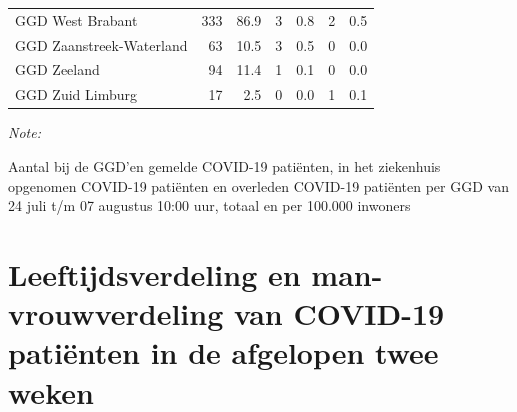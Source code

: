 \documentclass[
  english,
  man,floatsintext]{apa6}
\begin{document}
\begin{table}[H]
\begin{threeparttable}
\begin{tabular}{lrrrrrr}
GGD West Brabant & 333 & 86.9 & 3 & 0.8 & 2 & 0.5\\
GGD Zaanstreek-Waterland & 63 & 10.5 & 3 & 0.5 & 0 & 0.0\\
GGD Zeeland & 94 & 11.4 & 1 & 0.1 & 0 & 0.0\\
GGD Zuid Limburg & 17 & 2.5 & 0 & 0.0 & 1 & 0.1\\
\bottomrule
\end{tabular}
\begin{tablenotes}
\item \textit{Note: } 
\item Aantal bij de GGD’en gemelde COVID-19 patiënten, in het ziekenhuis opgenomen COVID-19 patiënten en overleden COVID-19 patiënten per GGD van 24 juli t/m 07 augustus 10:00 uur, totaal en per 100.000 inwoners
\end{tablenotes}
\end{threeparttable}
\endgroup{}
\end{table}

\newpage

\hypertarget{leeftijdsverdeling-en-man-vrouwverdeling-van-covid-19-patiuxebnten-in-de-afgelopen-twee-weken}{%
\section{Leeftijdsverdeling en man-vrouwverdeling van COVID-19 patiënten in de afgelopen twee weken}\label{leeftijdsverdeling-en-man-vrouwverdeling-van-covid-19-patiuxebnten-in-de-afgelopen-twee-weken}}
\end{document}
